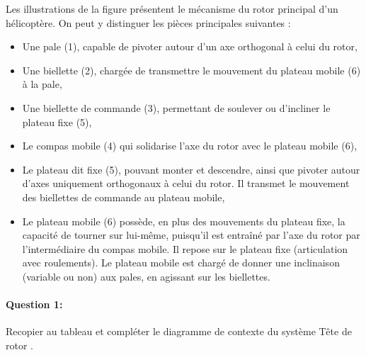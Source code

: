 Les illustrations de la figure présentent le mécanisme du rotor principal d'un hélicoptère. On peut y distinguer les pièces principales suivantes :
\begin{itemize}
 \item Une pale (1), capable de pivoter autour d'un axe orthogonal à celui du rotor,
 \item Une biellette (2), chargée de transmettre le mouvement du plateau mobile (6) à la pale,
 \item Une biellette de commande (3), permettant de soulever ou d'incliner le plateau fixe (5),
 \item Le compas mobile (4) qui solidarise l'axe du rotor avec le plateau mobile (6),
 \item Le plateau dit fixe (5), pouvant monter et descendre, ainsi que pivoter autour d'axes uniquement orthogonaux à celui du rotor. Il transmet le mouvement des biellettes de commande au plateau mobile,
 \item Le plateau mobile (6) possède, en plus des mouvements du plateau fixe, la capacité de tourner sur lui-même, puisqu'il est entraîné par l'axe du rotor par l'intermédiaire du compas mobile. Il repose sur le plateau fixe (articulation avec roulements). Le plateau mobile est chargé de donner une inclinaison (variable ou non) aux pales, en agissant sur les biellettes.
\end{itemize}

\clearpage

\paragraph{Question 1:} Recopier au tableau et compléter le diagramme de contexte du système \og Tête de rotor \fg.

\begin{center}
\end{center}

